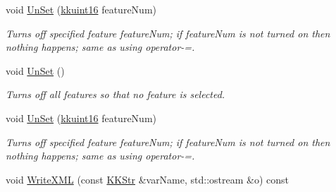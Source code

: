 \begin{DoxyCompactItemize}
void \hyperlink{class_k_k_m_l_l_1_1_feature_num_list_a61f29e30a0ece8d4019780906f74bf4c}{Un\+Set} (\hyperlink{namespace_k_k_b_aa8c7d4d30381c8a0b6fce68974a9c8a9}{kkuint16} feature\+Num)
\begin{DoxyCompactList}\small\item\em Turns off specified feature \textquotesingle{}feature\+Num\textquotesingle{}; if \textquotesingle{}feature\+Num\textquotesingle{} is not turned on then nothing happens; same as using \textquotesingle{}operator-\/=\textquotesingle{}. \end{DoxyCompactList}\item 
void \hyperlink{class_k_k_m_l_l_1_1_feature_num_list_a22f76daeffbc1d2e90936c0f8d25f482}{Un\+Set} ()
\begin{DoxyCompactList}\small\item\em Turns off all features so that no feature is selected. \end{DoxyCompactList}\item 
void \hyperlink{class_k_k_m_l_l_1_1_feature_num_list_a5cd3762dfe7881f3e0dbf8435d0bd9aa}{Un\+Set} (\hyperlink{namespace_k_k_b_aa8c7d4d30381c8a0b6fce68974a9c8a9}{kkuint16} feature\+Num)
\begin{DoxyCompactList}\small\item\em Turns off specified feature \textquotesingle{}feature\+Num\textquotesingle{}; if \textquotesingle{}feature\+Num\textquotesingle{} is not turned on then nothing happens; same as using \textquotesingle{}operator-\/=\textquotesingle{}. \end{DoxyCompactList}\item 
void \hyperlink{class_k_k_m_l_l_1_1_feature_num_list_a8119e4ff5c20ad2793df8766c9cb84ea}{Write\+X\+ML} (const \hyperlink{class_k_k_b_1_1_k_k_str}{K\+K\+Str} \&var\+Name, std\+::ostream \&o) const 
\end{DoxyCompactItemize}
